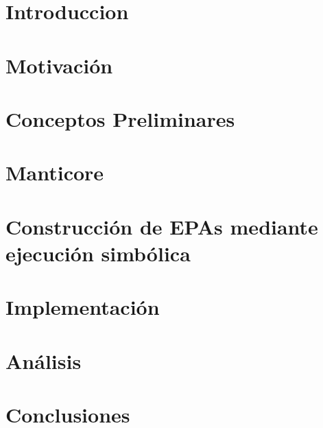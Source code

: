 \documentclass[11pt,a4paper,twoside]{tesis}
\theoremstyle{definition}
\begin{document}

\def\autor{Daniel Wappner}
\def\tituloTesis{Construcción de Enabledness Preserving Abstractions para smart contracts mediante ejecución simbólica}
\def\runtitulo{Construcción de Enabledness Preserving Abstractions para Smart Contracts mediante ejecución simbólica}
\def\runtitle{Construcción de Enabledness Preserving Abstractions para smart contracts mediante ejecución simbólica}
\def\codirector{Diego David Garbervetsky}
\def\director{Javier Godoy}
\def\lugar{Buenos Aires, 2024}


\frontmatter
\pagestyle{empty}





\cleardoublepage
\tableofcontents

\mainmatter
\pagestyle{headings}


\chapter{Introduccion}


\chapter{Motivación}

\chapter{Conceptos Preliminares}


\chapter{Manticore}


\chapter{Construcción de EPAs mediante ejecución simbólica}


\chapter{Implementación}


\chapter{Análisis}


\chapter{Conclusiones}

\backmatter
\printbibliography
\end{document}
